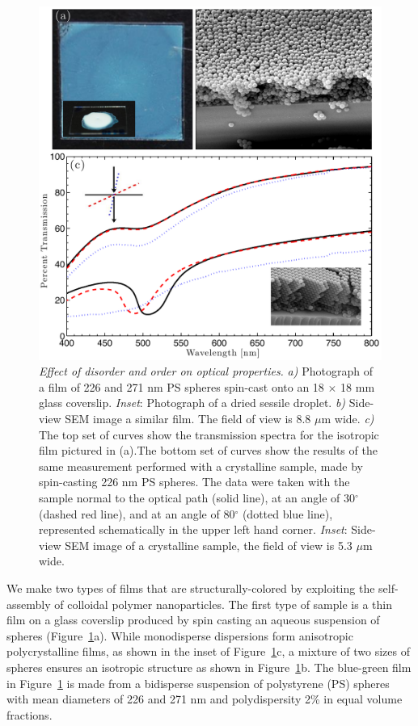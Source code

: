 \begin{figure}[htbp]
\centering
\includegraphics[width=.9\textwidth]{figures/transmission_100128.pdf}
\caption{\label{fig:transmission}\emph{Effect of disorder and order on optical properties.} 
	\emph{a)} Photograph of a film of 226 and 271 nm PS spheres spin-cast onto an 18 $\times$ 18 mm glass coverslip. \emph{Inset}: Photograph of a dried sessile droplet. 		\emph{b)} Side-view SEM image a similar film. The field of view is 8.8 $\mu$m wide. 	\emph{c)} The top set of curves show the transmission spectra for the isotropic film pictured in (a).The bottom set of curves show the results of the same measurement performed with a crystalline sample, made by spin-casting 226 nm PS spheres. The data were taken with the sample normal to the optical path (solid line), at an angle of 30$^{\circ}$ (dashed red line), and at an angle of 80$^{\circ}$ (dotted blue line), represented schematically in the upper left hand corner. \emph{Inset}:  Side-view SEM image of a crystalline sample, the field of view is 5.3 $\mu$m wide.}
\end{figure}

We make two types of films that are structurally-colored by exploiting the self-assembly of colloidal polymer nanoparticles.
The first type of sample is a thin film on a glass coverslip produced by spin casting an aqueous suspension of spheres (Figure~\ref{fig:transmission}a).
While monodisperse dispersions form anisotropic polycrystalline films, as shown in the inset of Figure~\ref{fig:transmission}c, a mixture of two sizes of spheres ensures an isotropic structure as shown in Figure~\ref{fig:transmission}b.
The blue-green film  in Figure~\ref{fig:transmission} is made from a bidisperse suspension of polystyrene (PS) spheres with mean diameters of 226 and 271 nm and polydispersity 2\% in equal volume fractions.

